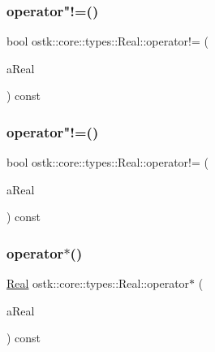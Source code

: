 \mbox{\label{classostk_1_1core_1_1types_1_1_real_af290cfcf0eb60109727130b582113c81}} 
\subsubsection{\texorpdfstring{operator"!=()}{operator!=()}\hspace{0.1cm}{\footnotesize\ttfamily [1/2]}}
{\footnotesize\ttfamily bool ostk\+::core\+::types\+::\+Real\+::operator!= (\begin{DoxyParamCaption}\item[{const \hyperlink{classostk_1_1core_1_1types_1_1_real}{Real} \&}]{a\+Real }\end{DoxyParamCaption}) const}

\mbox{\label{classostk_1_1core_1_1types_1_1_real_a5c372f76777883ea02b0e23bed3938e0}} 
\subsubsection{\texorpdfstring{operator"!=()}{operator!=()}\hspace{0.1cm}{\footnotesize\ttfamily [2/2]}}
{\footnotesize\ttfamily bool ostk\+::core\+::types\+::\+Real\+::operator!= (\begin{DoxyParamCaption}\item[{const \hyperlink{classostk_1_1core_1_1types_1_1_real_aa26f796c30b514c98d573f82e3b02296}{Real\+::\+Value\+Type} \&}]{a\+Real }\end{DoxyParamCaption}) const}

\mbox{\label{classostk_1_1core_1_1types_1_1_real_a6de42bb8755a4873cd74bec9943091ee}} 
\subsubsection{\texorpdfstring{operator$\ast$()}{operator*()}\hspace{0.1cm}{\footnotesize\ttfamily [1/3]}}
{\footnotesize\ttfamily \hyperlink{classostk_1_1core_1_1types_1_1_real}{Real} ostk\+::core\+::types\+::\+Real\+::operator$\ast$ (\begin{DoxyParamCaption}\item[{const \hyperlink{classostk_1_1core_1_1types_1_1_real}{Real} \&}]{a\+Real }\end{DoxyParamCaption}) const}

